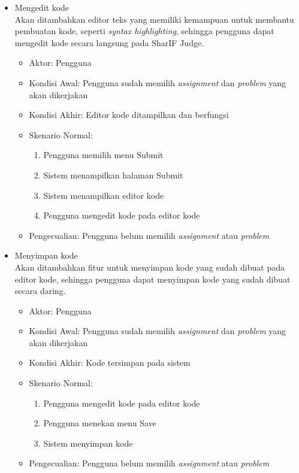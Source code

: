 \begin{itemize}
    \item Mengedit kode \\ Akan ditambahkan editor teks yang memiliki kemampuan untuk membantu pembuatan kode, seperti \textit{syntax highlighting}, sehingga pengguna dapat mengedit kode secara langsung pada SharIF Judge.
        \begin{itemize}
            \item Aktor: Pengguna
            \item Kondisi Awal: Pengguna sudah memilih \textit{assignment} dan \textit{problem} yang akan dikerjakan
            \item Kondisi Akhir: Editor kode ditampilkan dan berfungsi
            \item Skenario Normal:
                \begin{enumerate}
                    \item Pengguna memilih menu Submit
                    \item Sistem menampilkan halaman Submit
                    \item Sistem menampilkan editor kode
                    \item Pengguna mengedit kode pada editor kode
                \end{enumerate}
            \item Pengecualian: Pengguna belum memilih \textit{assignment} atau \textit{problem}
        \end{itemize}
        
    \item Menyimpan kode \\ Akan ditambahkan fitur untuk menyimpan kode yang sudah dibuat pada editor kode, sehingga pengguna dapat menyimpan kode yang sudah dibuat secara daring.
            \begin{itemize}
            \item Aktor: Pengguna
            \item Kondisi Awal: Pengguna sudah memilih \textit{assignment} dan \textit{problem} yang akan dikerjakan
            \item Kondisi Akhir: Kode tersimpan pada sistem
            \item Skenario Normal:
                \begin{enumerate}
                    \item Pengguna mengedit kode pada editor kode
                    \item Pengguna menekan menu Save
                    \item Sistem menyimpan kode
                \end{enumerate}
            \item Pengecualian: Pengguna belum memilih \textit{assignment} atau \textit{problem}
        \end{itemize}
        

\end{itemize}
